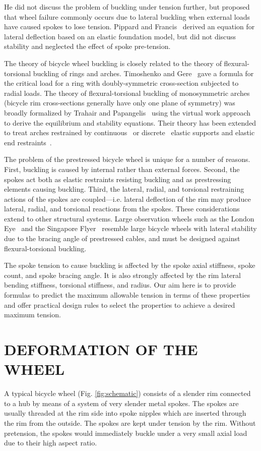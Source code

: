 \documentclass{bmd2016p}
\begin{document}
He did not discuss the problem of buckling under tension further, but proposed that wheel failure commonly occurs due to lateral buckling when external loads have caused spokes to lose tension. Pippard and Francis~\cite{Pippard1932d} derived an equation for lateral deflection based on an elastic foundation model, but did not discuss stability and neglected the effect of spoke pre-tension.

The theory of bicycle wheel buckling is closely related to the theory of flexural-torsional buckling of rings and arches. Timoshenko and Gere~\cite{Timoshenko1961a} gave a formula for the critical load for a ring with doubly-symmetric cross-section subjected to radial loads. The theory of flexural-torsional buckling of monosymmetric arches (bicycle rim cross-sections generally have only one plane of symmetry) was broadly formalized by Trahair and Papangelis~\cite{Trahair1987b} using the virtual work approach to derive the equilibrium and stability equations. Their theory has been extended to treat arches restrained by continuous~\cite{Pi2002b} or discrete~\cite{Bradford2002d} elastic supports and elastic end restraints~\cite{Guo2014b}.

The problem of the prestressed bicycle wheel is unique for a number of reasons. First, buckling is caused by internal rather than external forces. Second, the spokes act both as elastic restraints resisting buckling and as prestressing elements causing buckling. Third, the lateral, radial, and torsional restraining actions of the spokes are coupled---i.e. lateral deflection of the rim may produce lateral, radial, and torsional reactions from the spokes. These considerations extend to other structural systems. Large observation wheels such as the London Eye~\cite{Mann2001a} and the Singapore Flyer~\cite{Allsop2009a} resemble large bicycle wheels with lateral stability due to the bracing angle of prestressed cables, and must be designed against flexural-torsional buckling.

The spoke tension to cause buckling is affected by the spoke axial stiffness, spoke count, and spoke bracing angle. It is also strongly affected by the rim lateral bending stiffness, torsional stiffness, and radius. Our aim here is to provide formulas to predict the maximum allowable tension in terms of these properties and offer practical design rules to select the properties to achieve a desired maximum tension.



\section{DEFORMATION OF THE WHEEL}
A typical bicycle wheel (Fig. \ref{fig:schematic}) consists of a slender rim connected to a hub by means of a system of very slender metal spokes. The spokes are usually threaded at the rim side into spoke nipples which are inserted through the rim from the outside. The spokes are kept under tension by the rim. Without pretension, the spokes would immediately buckle under a very small axial load due to their high aspect ratio.
\end{document}
